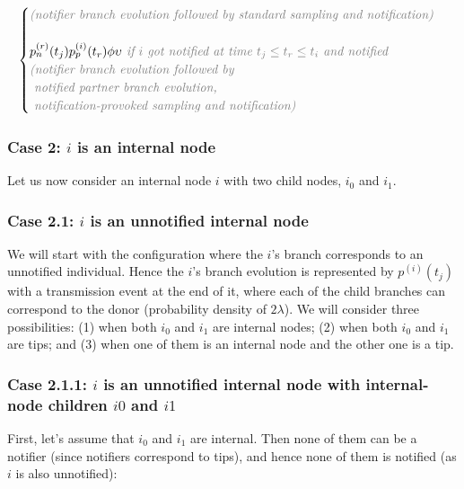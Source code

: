 \documentclass[a4paper,10pt]{article}
\begin{document}
\begin{equation}
\begin{array}{ll}
\begin{cases}
\textit{\color{gray} (notifier branch evolution followed by standard sampling and  notification)}\\
\\
p_n^{(r)}(t_j) p_p^{(i)}(t_r) \phi \upsilon \textit{\color{gray} ~if $i$ got notified at time $t_j \leq t_r \leq t_i$ and notified}\\
\textit{\color{gray} (notifier branch evolution followed by} \\
\textit{\color{gray}~notified partner branch evolution,} \\
\textit{\color{gray}~notification-provoked sampling and notification)}\\
\end{cases}\\
\end{array}
\label{eq:tip}
\end{equation}

\subsubsection*{Case 2: $i$ is an internal node} 
Let us now consider an internal node $i$ with two child nodes, $i_0$ and $i_1$. 

\subsubsection*{Case 2.1: $i$ is an unnotified internal node} 
We will start with the configuration where the $i$'s branch corresponds to an unnotified individual. Hence the $i$'s branch evolution is represented by $p^{(i)}(t_j)$ with a transmission event at the end of it, where each of the child branches can correspond to the donor (probability density of $2\lambda$). We will consider three possibilities: (1) when both $i_0$ and $i_1$ are internal nodes; (2) when both $i_0$ and $i_1$ are tips; and (3) when one of them is an internal node and the other one is a tip.


\subsubsection*{Case 2.1.1: $i$ is an unnotified internal node with internal-node children $i0$ and $i1$}

First, let's assume that $i_0$ and $i_1$ are internal. Then none of them can be a notifier (since notifiers correspond to tips), and hence none of them is notified (as $i$ is also unnotified):
\end{document}
